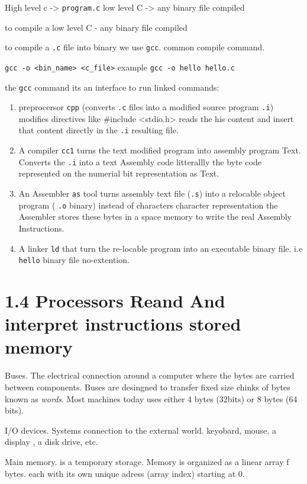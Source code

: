 High level c -\textgreater{} \texttt{program.c}
low level C -\textgreater{} any binary file compiled

to compile a 
low level C - any binary file compiled

to compile a \texttt{.c} file into binary we use \texttt{gcc}.
common compile command.

\texttt{gcc -o \textless{}bin\_name\textgreater{} \textless{}c\_file\textgreater{}} example \texttt{gcc -o hello hello.c}

the \texttt{gcc} command its an interface to run linked commands:

\begin{enumerate}
  \item preprocersor \texttt{cpp} (converts \texttt{.c} files into a modified source program \texttt{.i}) modifies directives like \#include \textless{}stdio.h\textgreater{} reads the his content and insert that content directly in the \texttt{.i} resulting file.
  \item A compiler \texttt{cc1} turns the text modified program into assembly program Text. Converts the \texttt{.i} into a text Assembly code litterallly the byte code represented on the numerial bit representation as Text.
  \item An Assembler \texttt{as} tool turns assembly text file (\texttt{.s}) into a relocable object program ( \texttt{.o} binary) instead of characters character representation the Assembler stores these bytes in a space memory to write the real Assembly Instructions.
  \item A linker \texttt{ld} that turn the re-locable program into an executable binary file. i.e \texttt{hello} binary file no-extention.


\end{enumerate}
\section{1.4 Processors Reand And interpret instructions stored memory}


Buses. The electrical connection around a computer where the bytes are carried between components. Buses are desingned to transfer fixed size chinks of bytes known as \textit{words}. Most machines today uses either 4 bytes (32bits) or 8 bytes (64 bits).

I/O devices. Systems connection to the external world. keyobard, mouse, a display , a disk drive, etc.

Main memory. is a temporary storage. Memory is organized as a linear array f bytes. each with its own unique adress (array index) starting at 0.

